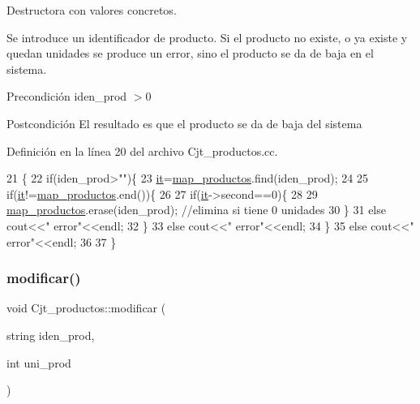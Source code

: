 Destructora con valores concretos. 

Se introduce un identificador de producto. Si el producto no existe, o ya existe y quedan unidades se produce un error, sino el producto se da de baja en el sistema. \begin{DoxyPrecond}{Precondición}
iden\+\_\+prod $>$0 
\end{DoxyPrecond}
\begin{DoxyPostcond}{Postcondición}
El resultado es que el producto se da de baja del sistema 
\end{DoxyPostcond}


Definición en la línea 20 del archivo Cjt\+\_\+productos.\+cc.


\begin{DoxyCode}
21 \{
22   \textcolor{keywordflow}{if}(iden\_prod>\textcolor{stringliteral}{""})\{
23     \hyperlink{class_cjt__productos_adedbe2194ed053eb446ec367e6d5e60e}{it}=\hyperlink{class_cjt__productos_a44e63c644fdec6cff81dcdb3cf79860c}{map\_productos}.find(iden\_prod);
24 
25     \textcolor{keywordflow}{if}(\hyperlink{class_cjt__productos_adedbe2194ed053eb446ec367e6d5e60e}{it}!=\hyperlink{class_cjt__productos_a44e63c644fdec6cff81dcdb3cf79860c}{map\_productos}.end())\{
26 
27       \textcolor{keywordflow}{if}(\hyperlink{class_cjt__productos_adedbe2194ed053eb446ec367e6d5e60e}{it}->second==0)\{
28 
29         \hyperlink{class_cjt__productos_a44e63c644fdec6cff81dcdb3cf79860c}{map\_productos}.erase(iden\_prod); \textcolor{comment}{//elimina si tiene 0 unidades}
30       \}
31       \textcolor{keywordflow}{else} cout<<\textcolor{stringliteral}{"  error"}<<endl;
32     \}
33     \textcolor{keywordflow}{else} cout<<\textcolor{stringliteral}{"  error"}<<endl;
34   \}
35   \textcolor{keywordflow}{else}  cout<<\textcolor{stringliteral}{"  error"}<<endl;
36 
37 \}
\end{DoxyCode}
\mbox{\label{class_cjt__productos_ac120487a0d46654b0d89654f20055083}} 
\subsubsection{\texorpdfstring{modificar()}{modificar()}}
{\footnotesize\ttfamily void Cjt\+\_\+productos\+::modificar (\begin{DoxyParamCaption}\item[{string}]{iden\+\_\+prod,  }\item[{int}]{uni\+\_\+prod }\end{DoxyParamCaption})}



